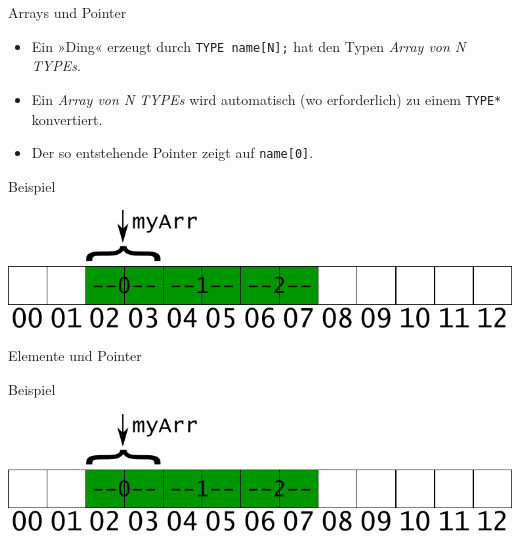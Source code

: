\begin{frame}[fragile]{Arrays und Pointer}
	\small
	\begin{itemize}[<+->]
		\item Ein »Ding« erzeugt durch \verb|TYPE name[N];| hat den Typen \emph{Array von N TYPEs}.
		\item Ein \emph{Array von N TYPEs} wird automatisch (wo erforderlich) zu einem \verb|TYPE*| konvertiert.
		\item Der so entstehende Pointer zeigt auf \verb|name[0]|.
	\end{itemize}
	
	\uncover<+->
	{
		\begin{block}{Beispiel}
			{\footnotesize
				
			}
			
			\includegraphics[width=0.75\linewidth]{images/array_elems}
		\end{block}
	}
\end{frame}

\begin{frame}[fragile]{Elemente und Pointer}
	\begin{block}{Beispiel}
		{\footnotesize
			
		}
		
		{
			{\footnotesize
				
			}
		}
		
		{
			{\footnotesize
				
			}
		}
		
		\vspace{1em}
		\includegraphics[width=0.75\linewidth]{images/array_elems}
	\end{block}
\end{frame}
